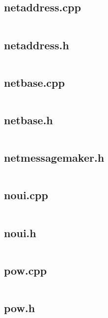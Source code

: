 \documentclass{article}
\begin{document}
\subsection{netaddress.cpp}
\inputminted{cpp}{/home/dufferzafar/dev/@clones/bitcoin/src/netaddress.cpp}
\newpage

\subsection{netaddress.h}
\inputminted{cpp}{/home/dufferzafar/dev/@clones/bitcoin/src/netaddress.h}
\newpage

\subsection{netbase.cpp}
\inputminted{cpp}{/home/dufferzafar/dev/@clones/bitcoin/src/netbase.cpp}
\newpage

\subsection{netbase.h}
\inputminted{cpp}{/home/dufferzafar/dev/@clones/bitcoin/src/netbase.h}
\newpage

\subsection{netmessagemaker.h}
\inputminted{cpp}{/home/dufferzafar/dev/@clones/bitcoin/src/netmessagemaker.h}
\newpage

\subsection{noui.cpp}
\inputminted{cpp}{/home/dufferzafar/dev/@clones/bitcoin/src/noui.cpp}
\newpage

\subsection{noui.h}
\inputminted{cpp}{/home/dufferzafar/dev/@clones/bitcoin/src/noui.h}
\newpage

\subsection{pow.cpp}
\inputminted{cpp}{/home/dufferzafar/dev/@clones/bitcoin/src/pow.cpp}
\newpage

\subsection{pow.h}
\inputminted{cpp}{/home/dufferzafar/dev/@clones/bitcoin/src/pow.h}
\newpage
\end{document}
